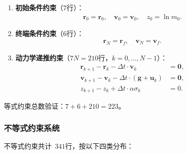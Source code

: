 \begin{enumerate}
  \item \textbf{初始条件约束}（$7$行）：
  \begin{align}
  \bm r_0 = \bm r_0,\quad \bm v_0 = \bm v_0,\quad z_0 = \ln m_0.
  \end{align}

  \item \textbf{终端条件约束}（$6$行）：
  \begin{align}
  \bm r_N = \bm r_f,\quad \bm v_N = \bm v_f.
  \end{align}

  \item \textbf{动力学递推约束}（$7N=210$行，$k=0,\dots,N-1$）：
  \begin{align}
  \bm r_{k+1} - \bm r_k - \Delta t\cdot\bm v_k &= \bm 0,\\
  \bm v_{k+1} - \bm v_k - \Delta t\cdot(\bm g + \bm u_k) &= \bm 0,\\
  z_{k+1} - z_k + \Delta t\cdot\alpha\sigma_k &= 0.
  \end{align}
\end{enumerate}

等式约束总数验证：$7 + 6 + 210 = 223$。

\subsubsection{不等式约束系统}

不等式约束共计~$341$行，按以下四类分布：

